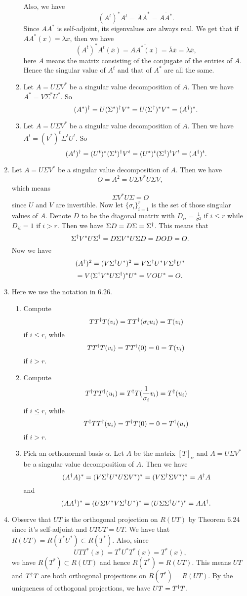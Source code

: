 \begin{enumerate}
\begin{enumerate}
Also, we have 
\[(A^t)^*A^t=\overline{A}\overline{A}^*=\overline{AA^*}.\]
Since $AA^*$ is self-adjoint, its eigenvalues are always real. We get that if $AA^*(x)=\lambda x$, then we have 
\[(A^t)^*A^t(\overline{x})=\overline{AA^*(x)}=\overline{\lambda }\overline{x}=\lambda\overline{x},\]
here $\overline{A}$ means the matrix consisting of the conjugate of the entries of $A$.
Hence the singular value of $A^t$ and that of $A^*$ are all the same.
\item Let $A=U\Sigma V^*$ be a singular value decomposition of $A$. Then we have $A^*=V\Sigma ^* U^*$. So 
\[(A^*)^{\dagger}=U(\Sigma^*)^{\dagger} V^*=U(\Sigma^{\dagger} )^*V^*=(A^{\dagger})^*.\]
\item Let $A=U\Sigma V^*$ be a singular value decomposition of $A$. Then we have $A^t=(V^*)^t \Sigma ^t U^t$. So 
\[(A^t)^{\dagger}=(U^t)^*(\Sigma^t)^{\dagger} V^t=(U^*)^t(\Sigma^{\dagger} )^tV^t=(A^{\dagger})^t.\]
\end{enumerate}
\item Let $A=U\Sigma V^*$ be a singular value decomposition of $A$. Then we have 
\[O=A^2=U\Sigma V^*U\Sigma V,\]
which means 
\[\Sigma V^*U\Sigma =O\]
since $U$ and $V$ are invertible. Now let $\{\sigma_i\}_{i=1}^r$ is the set of those singular values of $A$. Denote $D$ to be the diagonal matrix with $D_{ii}=\frac{1}{\sigma^2}$ if $i\leq r$ while $D_{ii}=1$ if $i>r$. Then we have $\Sigma D=D\Sigma =\Sigma^{\dagger}$. This means that 
\[\Sigma^{\dagger} V^*U\Sigma^{\dagger} =D\Sigma V^*U\Sigma D=DOD=O.\]
Now we have 
\[(A^{\dagger})^2=(V\Sigma^{\dagger} U^*)^2=V\Sigma^{\dagger} U^*V\Sigma^{\dagger} U^*\]
\[=V(\Sigma^{\dagger} V^*U\Sigma^{\dagger} )^*U^*=VOU^*=O.\]
\item Here we use the notation in 6.26. \begin{enumerate}
\item Compute 
\[TT^{\dagger} T(v_i)=TT^{\dagger}(\sigma_iu_i)=T(v_i)\]
if $i\leq r$, while 
\[TT^{\dagger} T(v_i)=TT^{\dagger}(0)=0=T(v_i)\]
if $i>r$.
\item Compute 
\[T^{\dagger} TT^{\dagger}(u_i)=T^{\dagger} T(\frac{1}{\sigma_i}v_i)=T^{\dagger} (u_i)\]
if $i\leq r$, while 
\[T^{\dagger} TT^{\dagger} (u_i)=T^{\dagger} T(0)=0=T^{\dagger} (u_i)\]
if $i>r$.
\item Pick an orthonormal basis $\alpha $. Let $A$ be the matrix $[T]_{\alpha}$ and $A=U\Sigma V^*$ be a singular value decomposition of $A$. Then we have 
\[(A^{\dagger} A)^*=(V\Sigma^{\dagger} U^*U\Sigma V^*)^*=(V\Sigma^{\dagger} \Sigma V^*)^*=A^{\dagger} A\]
and 
\[(AA^{\dagger})^*=(U\Sigma V^*V\Sigma ^{\dagger} U^*)^*=(U\Sigma \Sigma^{\dagger} U^*)^*=AA^{\dagger} .\]
\end{enumerate}
\item Observe that $UT$ is the orthogonal projection on $R(UT)$ by Theorem 6.24 since it's self-adjoint and $UTUT=UT$. We have that $R(UT)=R(T^*U^*)\subset R(T^*)$. Also, since 
\[UTT^*(x)=T^*U^*T^*(x)=T^*(x),\]
we have $R(T^*)\subset R(UT)$ and hence $R(T^*)=R(UT)$. This means $UT$ and $T^{\dagger} T$ are both orthogonal projections on $R(T^*)=R(UT)$. By the uniqueness of orthogonal projections, we have $UT=T^{\dagger} T$. 


\end{enumerate}
